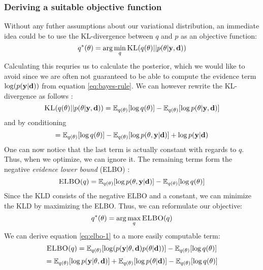 \subsubsection{Deriving a suitable objective function}
Without any futher assumptions about our variational distribution, an immediate idea could be to use the KL-divergence between $q$ and $p$ as an objective function:
\begin{equation}\label{eq:kld}q^*(\theta) = \arg \min_{q} \textsc{KL}(q(\theta) || p(\theta | \mathbf{y}, \mathbf{d}))\end{equation}
Calculating this requries us to calculate the posterior, which we would like to avoid since we are often not guaranteed to be able to compute the evidence term $\log(p(\mathbf{y} | \mathbf{d}))$ from equation \ref{eq:bayes-rule}.
We can however rewrite the KL-divergence as follows \cite{blei17}:
\begin{equation}\textsc{KL}(q(\theta)|| p(\theta| \mathbf{y}, \mathbf{d})) = \mathbb{E}_{q(\theta)}[\log q(\theta)] - \mathbb{E}_{q(\theta)}[\log p(\theta|\mathbf{y}, \mathbf{d})]\end{equation}
and by conditioning
\begin{equation}\label{eq:kld-2}= \mathbb{E}_{q(\theta)}[\log q(\theta)] - \mathbb{E}_{q(\theta)}[\log p(\theta, \mathbf{y}| \mathbf{d})] + \log p(\mathbf{y}| \mathbf{d})\end{equation}
One can now notice that the last term is actually constant with regards to $q$.
Thus, when we optimize, we can ignore it. The remaining terms form the negative \textit{evidence lower bound} (ELBO) \cite{blei17}:
\begin{equation}\label{eq:elbo-1}\textsc{ELBO}(q)= \mathbb{E}_{q(\theta)}[\log p(\theta, \mathbf{y}| \mathbf{d})]-\mathbb{E}_{q(\theta)}[\log q(\theta)]\end{equation}
Since the KLD consists of the negative ELBO and a constant, we can minimize the KLD by maximizing the ELBO. Thus, we can reformulate our objective:
\begin{equation}\label{eq:elbo-objective}q^*(\theta) = \arg \max_{q} \textsc{ELBO}(q)\end{equation}
We can derive equation \ref{eq:elbo-1} to a more easily computable term:
\begin{equation}\label{eq:elbo-2}\textsc{ELBO}(q) = \mathbb{E}_{q(\theta)}[\log (p(\mathbf{y}| \theta , \mathbf{d})p(\theta | \mathbf{d}))] - \mathbb{E}_{q(\theta)}[\log q(\theta)]\end{equation}
\begin{equation}= \mathbb{E}_{q(\theta)}[\log p(\mathbf{y}| \theta , \mathbf{d})]+\mathbb{E}_{q(\theta)}[\log p(\theta | \mathbf{d})] - \mathbb{E}_{q(\theta)}[\log q(\theta)]\end{equation}
